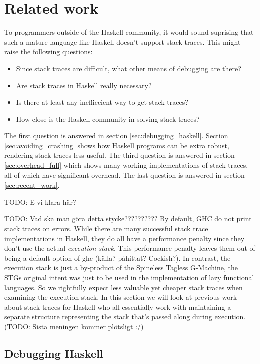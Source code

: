 \chapter{Related work}

To programmers outside of the Haskell community, it would sound
suprising that such a mature language like Haskell doesn't support stack
traces. This might raise the following questions:

\begin{itemize}
\itemsep1pt\parskip0pt
\item
  Since stack traces are difficult, what other means of debugging are
  there?
\item
  Are stack traces in Haskell really necessary?
\item
  Is there at least any ineffiecient way to get stack traces?
\item
  How close is the Haskell community in solving stack traces?
\end{itemize}

The first question is answered in section \ref{sec:debugging_haskell}.
Section \ref{sec:avoiding_crashing} shows how Haskell programs can be
extra robust, rendering stack traces less useful. The third question is
answered in section \ref{sec:overhead_full} which shows many working
implementations of stack traces, all of which have significant overhead.
The last question is answered in section \ref{sec:recent_work}.

TODO: E vi klara här?

TODO: Vad ska man göra detta stycke??????????
By default, GHC do not print stack traces on errors. While there are many
successful stack trace implementations in Haskell, they do all have a
performance penalty since they don't use the actual \emph{execution stack}.
This performance penalty leaves them out of being a default option of ghc
(källa?  påhittat? Cockish?).  In contrast, the execution stack is just a
by-product of the Spineless Tagless G-Machine, the STGs original intent was
just to be used in the implementation of lazy functional languages.  So we
rightfully expect less valuable yet cheaper stack traces when examining the
execution stack.  In this section we will look at previous work about stack
traces for Haskell who all essentially work with maintaining a separate
structure representing the stack that's passed along during execution.
(TODO: Sista meningen kommer plötsligt :/)

\section{Debugging Haskell} \label{ sec:debugging_haskell }

